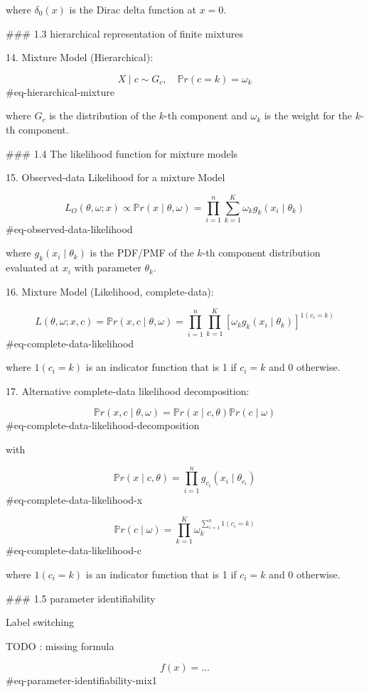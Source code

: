 where $\delta_0(x)$ is the Dirac delta function at $x=0$.

### 1.3 hierarchical representation of finite mixtures

14. Mixture Model (Hierarchical):

$$
X \mid c \sim G_c, \quad \mathbb{P}r(c = k) = \omega_k
$$ {#eq-hierarchical-mixture}

where $G_c$ is the distribution of the $k$-th component and $\omega_k$ is the weight for the $k$-th component.

### 1.4 The likelihood function for mixture models

15. Observed-data Likelihood for a mixture Model

$$
L_O(\theta, \omega; x) \propto \mathbb{P}r(x \mid \theta, \omega) = \prod_{i=1}^n \sum_{k=1}^K \omega_k g_k(x_i \mid \theta_k)
$$ {#eq-observed-data-likelihood}

where $g_k(x_i \mid \theta_k)$ is the PDF/PMF of the $k$-th component distribution evaluated at $x_i$ with parameter $\theta_k$.

16. Mixture Model (Likelihood, complete-data):

$$
L(\theta, \omega; x, c) = \mathbb{P}r(x, c \mid \theta, \omega) = \prod_{i=1}^n \prod_{k=1}^K [\omega_k g_k(x_i \mid \theta_k)]^{1(c_i = k)}
$$ {#eq-complete-data-likelihood}

where $1(c_i = k)$ is an indicator function that is 1 if $c_i = k$ and 0 otherwise.

17. Alternative complete-data likelihood decomposition:

$$
\mathbb{P}r(x, c \mid \theta, \omega) = \mathbb{P}r(x \mid c, \theta) \mathbb{P}r(c \mid \omega)
$$ {#eq-complete-data-likelihood-decomposition}

with

$$
\mathbb{P}r(x \mid c, \theta) = \prod_{i=1}^n g_{c_i}(x_i \mid \theta_{c_i})
$$ {#eq-complete-data-likelihood-x}

$$
\mathbb{P}r(c \mid \omega) = \prod_{k=1}^K \omega_k^{\sum_{i=1}^n 1(c_i = k)}
$$ {#eq-complete-data-likelihood-c}

where $1(c_i = k)$ is an indicator function that is 1 if $c_i = k$ and 0 otherwise.


### 1.5 parameter identifiability

Label switching

TODO : missing formula

$$
f(x) = ...
$$ {#eq-parameter-identifiability-mix1}


